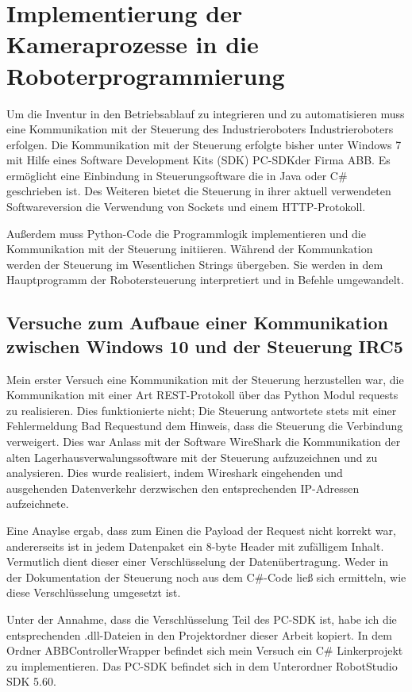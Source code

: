 \chapter{Implementierung der Kameraprozesse in die Roboterprogrammierung}

Um die Inventur in den Betriebsablauf zu integrieren und zu automatisieren muss eine Kommunikation mit der Steuerung des Industrieroboters Industrieroboters erfolgen. 
Die Kommunikation mit der Steuerung erfolgte bisher unter Windows 7 mit Hilfe eines Software Development Kits (SDK) \glq PC-SDK\grq der Firma ABB.
Es ermöglicht eine Einbindung in Steuerungsoftware die in Java oder C\# geschrieben ist. 
Des Weiteren bietet die Steuerung in ihrer aktuell verwendeten Softwareversion die Verwendung von Sockets und einem HTTP-Protokoll.

Außerdem muss Python-Code die Programmlogik implementieren und die Kommunikation mit der Steuerung initiieren. 
Während der Kommunkation werden der Steuerung im Wesentlichen Strings übergeben. 
Sie werden in dem Hauptprogramm der Robotersteuerung interpretiert und in Befehle umgewandelt.


\section{Versuche zum Aufbaue einer Kommunikation zwischen Windows 10 und der Steuerung IRC5}

Mein erster Versuch eine Kommunikation mit der Steuerung herzustellen war, die Kommunikation mit einer Art REST-Protokoll über das Python Modul \glq requests\grq{} zu realisieren.
Dies funktionierte nicht; Die Steuerung antwortete stets mit einer Fehlermeldung  Bad Request\grq und dem Hinweis, dass die Steuerung die Verbindung verweigert.
Dies war Anlass mit der Software WireShark die Kommunikation der alten Lagerhausverwalungssoftware mit der Steuerung aufzuzeichnen und zu analysieren.
Dies wurde realisiert, indem Wireshark eingehenden und ausgehenden Datenverkehr derzwischen den entsprechenden IP-Adressen aufzeichnete.

Eine Anaylse ergab, dass zum Einen die Payload der Request nicht korrekt war, andererseits ist in jedem Datenpaket ein 8-byte Header mit zufälligem Inhalt.
Vermutlich dient dieser einer Verschlüsselung der Datenübertragung. 
Weder in der Dokumentation der Steuerung noch aus dem C\#-Code ließ sich ermitteln, wie diese Verschlüsselung umgesetzt ist.

Unter der Annahme, dass die Verschlüsselung Teil des PC-SDK ist, habe ich die entsprechenden \glq .dll\grq{}-Dateien in den Projektordner dieser Arbeit kopiert.
In dem Ordner \grq ABBControllerWrapper\grq{} befindet sich mein Versuch ein C\# Linkerprojekt zu implementieren. 
Das PC-SDK befindet sich in dem Unterordner \grq RobotStudio SDK 5.60\grq{}.

